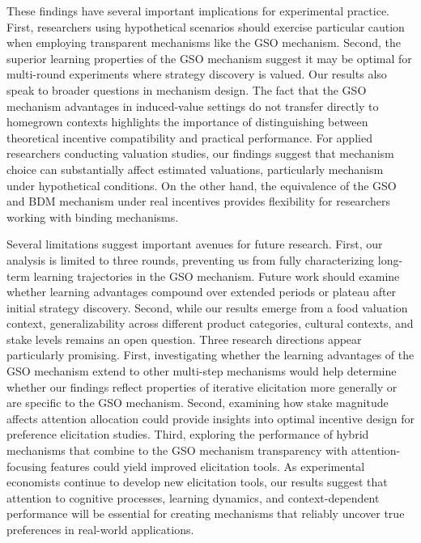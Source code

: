 \documentclass[12pt]{article}
\begin{document}
These findings have several important implications for experimental practice. First, researchers using hypothetical scenarios should exercise particular caution when employing transparent mechanisms like the GSO mechanism. Second, the superior learning properties of the GSO mechanism suggest it may be optimal for multi-round experiments where strategy discovery is valued. 
Our results also speak to broader questions in mechanism design. The fact that the GSO mechanism advantages in induced-value settings do not transfer directly to  homegrown contexts highlights the importance of distinguishing between theoretical incentive compatibility and practical performance. 
For applied researchers conducting valuation studies, our findings suggest that mechanism choice can substantially affect estimated valuations, particularly mechanism under hypothetical conditions. On the other hand, the equivalence of the GSO and BDM mechanism under real incentives provides flexibility for researchers working with binding mechanisms.


Several limitations suggest important avenues for future research. First, our analysis is limited to three rounds, preventing us from fully characterizing long-term learning trajectories in the GSO mechanism. Future work should examine whether learning advantages compound over extended periods or plateau after initial strategy discovery. Second, while our results emerge from a food valuation context, generalizability across different product categories, cultural contexts, and stake levels remains an open question.
Three research directions appear particularly promising. First, investigating whether the learning advantages of the GSO mechanism extend to other multi-step mechanisms would help determine whether our findings reflect properties of iterative elicitation more generally or are specific to the GSO mechanism. Second, examining how stake magnitude affects attention allocation could provide insights into optimal incentive design for preference elicitation studies. Third, exploring the performance of hybrid mechanisms that combine to the GSO mechanism transparency with attention-focusing features could yield improved elicitation tools.
 As experimental economists continue to develop new elicitation tools, our results suggest that attention to cognitive processes, learning dynamics, and context-dependent performance will be essential for creating mechanisms that reliably uncover true preferences in real-world applications.
\end{document}
